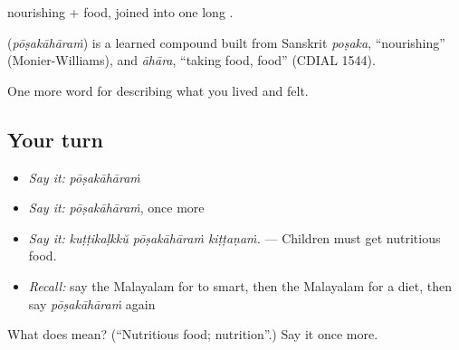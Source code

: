  nourishing +  food, joined into one long .

\begin{cousinweb}
\textbf{} (\emph{pōṣakāhāraṁ}) is a learned compound built from Sanskrit \emph{poṣaka}, \textquotedblleft{}nourishing\textquotedblright{} (Monier-Williams), and \emph{āhāra}, \textquotedblleft{}taking food, food\textquotedblright{} (CDIAL 1544).
\end{cousinweb}

\begin{grammarlens}[title={What you've built}]
One more word for describing what you lived and felt.
\end{grammarlens}

\subsection*{Your turn}
\begin{itemize}
\raggedright
  \item \emph{Say it:} \emph{pōṣakāhāraṁ}
  \item \emph{Say it:} \emph{pōṣakāhāraṁ}, once more
  \item \emph{Say it:} \emph{kuṭṭikaḷkkŭ pōṣakāhāraṁ kiṭṭaṇaṁ.} — Children must get nutritious food.
  \item \emph{Recall:} say the Malayalam for to smart, then the Malayalam for a diet, then say \emph{pōṣakāhāraṁ} again
\end{itemize}

\begin{tcolorbox}[breakable,colback=teal!4,colframe=teal!35!black,title={Before you move on}]
What does  mean? (\textquotedblleft{}Nutritious food; nutrition\textquotedblright{}.) Say it once more.
\end{tcolorbox}
